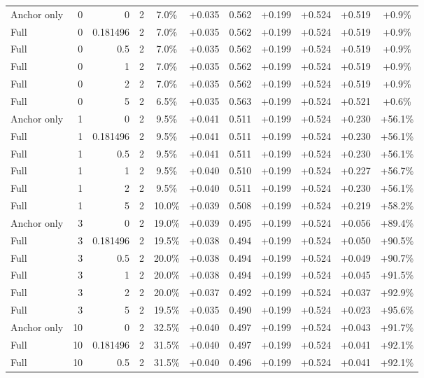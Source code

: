 \begin{table}[htbp]
\begin{tabular}{lrrrccccccc}
Anchor only & 0 & 0 & 2 & 7.0\% & +0.035 & 0.562 & +0.199 & +0.524 & +0.519 & +0.9\% \\
Full & 0 & 0.181496 & 2 & 7.0\% & +0.035 & 0.562 & +0.199 & +0.524 & +0.519 & +0.9\% \\
Full & 0 & 0.5 & 2 & 7.0\% & +0.035 & 0.562 & +0.199 & +0.524 & +0.519 & +0.9\% \\
Full & 0 & 1 & 2 & 7.0\% & +0.035 & 0.562 & +0.199 & +0.524 & +0.519 & +0.9\% \\
Full & 0 & 2 & 2 & 7.0\% & +0.035 & 0.562 & +0.199 & +0.524 & +0.519 & +0.9\% \\
Full & 0 & 5 & 2 & 6.5\% & +0.035 & 0.563 & +0.199 & +0.524 & +0.521 & +0.6\% \\
Anchor only & 1 & 0 & 2 & 9.5\% & +0.041 & 0.511 & +0.199 & +0.524 & +0.230 & +56.1\% \\
Full & 1 & 0.181496 & 2 & 9.5\% & +0.041 & 0.511 & +0.199 & +0.524 & +0.230 & +56.1\% \\
Full & 1 & 0.5 & 2 & 9.5\% & +0.041 & 0.511 & +0.199 & +0.524 & +0.230 & +56.1\% \\
Full & 1 & 1 & 2 & 9.5\% & +0.040 & 0.510 & +0.199 & +0.524 & +0.227 & +56.7\% \\
Full & 1 & 2 & 2 & 9.5\% & +0.040 & 0.511 & +0.199 & +0.524 & +0.230 & +56.1\% \\
Full & 1 & 5 & 2 & 10.0\% & +0.039 & 0.508 & +0.199 & +0.524 & +0.219 & +58.2\% \\
Anchor only & 3 & 0 & 2 & 19.0\% & +0.039 & 0.495 & +0.199 & +0.524 & +0.056 & +89.4\% \\
Full & 3 & 0.181496 & 2 & 19.5\% & +0.038 & 0.494 & +0.199 & +0.524 & +0.050 & +90.5\% \\
Full & 3 & 0.5 & 2 & 20.0\% & +0.038 & 0.494 & +0.199 & +0.524 & +0.049 & +90.7\% \\
Full & 3 & 1 & 2 & 20.0\% & +0.038 & 0.494 & +0.199 & +0.524 & +0.045 & +91.5\% \\
Full & 3 & 2 & 2 & 20.0\% & +0.037 & 0.492 & +0.199 & +0.524 & +0.037 & +92.9\% \\
Full & 3 & 5 & 2 & 19.5\% & +0.035 & 0.490 & +0.199 & +0.524 & +0.023 & +95.6\% \\
Anchor only & 10 & 0 & 2 & 32.5\% & +0.040 & 0.497 & +0.199 & +0.524 & +0.043 & +91.7\% \\
Full & 10 & 0.181496 & 2 & 31.5\% & +0.040 & 0.497 & +0.199 & +0.524 & +0.041 & +92.1\% \\
Full & 10 & 0.5 & 2 & 31.5\% & +0.040 & 0.496 & +0.199 & +0.524 & +0.041 & +92.1\% \\

\end{tabular}
\end{table}
